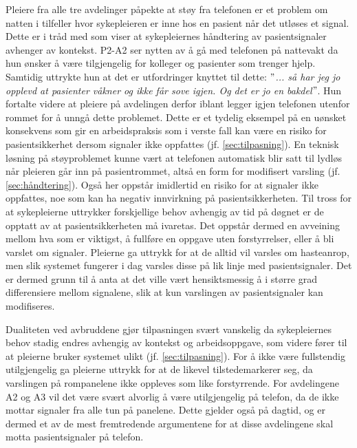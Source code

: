 \noindent
Pleiere fra alle tre avdelinger påpekte at støy fra telefonen er et problem om natten i tilfeller hvor sykepleieren er inne hos en pasient når det utløses et signal. Dette er i tråd med \citet{klemets13} som viser at sykepleiernes håndtering av pasientsignaler avhenger av kontekst. P2-A2 ser nytten av å gå med telefonen på nattevakt da hun ønsker å være tilgjengelig for kolleger og pasienter som trenger hjelp. Samtidig uttrykte hun at det er utfordringer knyttet til dette: \textit{ $"$... så har jeg jo opplevd at pasienter våkner og ikke får sove igjen. Og det er jo en bakdel$"$}. Hun fortalte videre at pleiere på avdelingen derfor iblant legger igjen telefonen utenfor rommet for å unngå dette problemet. Dette er et tydelig eksempel på en uønsket konsekvens som gir en arbeidspraksis som i verste fall kan være en risiko for pasientsikkerhet dersom signaler ikke oppfattes (jf. \ref{sec:tilpasning}). En teknisk løsning på støyproblemet kunne vært at telefonen automatisk blir satt til lydløs når pleieren går inn på pasientrommet, altså en form for modifisert varsling (jf. \ref{sec:håndtering}). Også her oppstår imidlertid en risiko for at signaler ikke oppfattes, noe som kan ha negativ innvirkning på pasientsikkerheten. Til tross for at sykepleierne uttrykker forskjellige behov avhengig av tid på døgnet er de opptatt av at pasientsikkerheten må ivaretas. Det oppstår dermed en avveining mellom hva som er viktigst, å fullføre en oppgave uten forstyrrelser, eller å bli varslet om signaler. Pleierne ga uttrykk for at de alltid vil varsles om hasteanrop, men slik systemet fungerer i dag varsles disse på lik linje med pasientsignaler. Det er dermed grunn til å anta at det ville vært hensiktsmessig å i større grad differensiere mellom signalene, slik at kun varslingen av pasientsignaler kan modifiseres.

\noindent
Dualiteten ved avbruddene gjør tilpasningen svært vanskelig da sykepleiernes behov stadig endres avhengig av kontekst og arbeidsoppgave, som videre fører til at pleierne bruker systemet ulikt (jf. \ref{sec:tilpasning}). For å ikke være fullstendig utilgjengelig ga pleierne uttrykk for at de likevel tilstedemarkerer seg, da varslingen på rompanelene ikke oppleves som like forstyrrende. For avdelingene A2 og A3 vil det være svært alvorlig å være utilgjengelig på telefon, da de ikke mottar signaler fra alle tun på panelene. Dette gjelder også på dagtid, og er dermed et av de mest fremtredende argumentene for at disse avdelingene skal motta pasientsignaler på telefon. 

